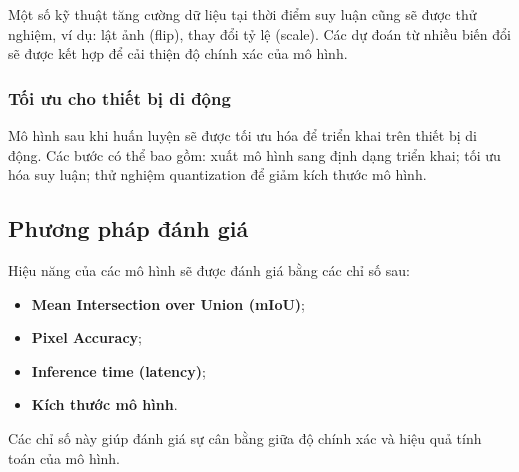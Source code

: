 Một số kỹ thuật tăng cường dữ liệu tại thời điểm suy luận cũng sẽ được thử nghiệm, ví dụ: lật ảnh (flip), thay đổi tỷ lệ (scale). Các dự đoán từ nhiều biến đổi sẽ được kết hợp để cải thiện độ chính xác của mô hình.

\subsubsection{Tối ưu cho thiết bị di động}

Mô hình sau khi huấn luyện sẽ được tối ưu hóa để triển khai trên thiết bị di động. Các bước có thể bao gồm: xuất mô hình sang định dạng triển khai; tối ưu hóa suy luận; thử nghiệm quantization để giảm kích thước mô hình.

\subsection{Phương pháp đánh giá}

Hiệu năng của các mô hình sẽ được đánh giá bằng các chỉ số sau:
\begin{itemize}
    \item \textbf{Mean Intersection over Union (mIoU)};
    \item \textbf{Pixel Accuracy};
    \item \textbf{Inference time (latency)};
    \item \textbf{Kích thước mô hình}.
\end{itemize}
Các chỉ số này giúp đánh giá sự cân bằng giữa độ chính xác và hiệu quả tính toán của mô hình.
